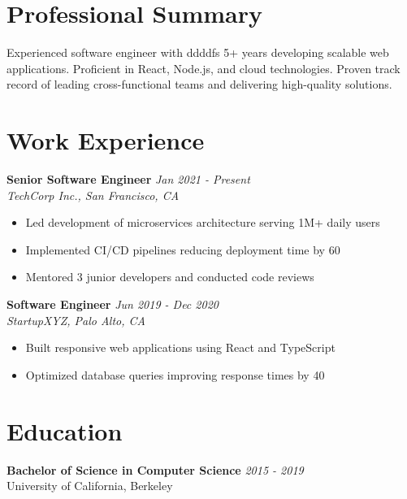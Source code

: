 \documentclass{article}
\begin{document}
\section*{Professional Summary}
Experienced software engineer with ddddfs 5+ years developing scalable web applications. Proficient in React, Node.js, and cloud technologies. Proven track record of leading cross-functional teams and delivering high-quality solutions.

\vspace{0.2cm}

\section*{Work Experience}

\textbf{Senior Software Engineer} \hfill \textit{Jan 2021 - Present} \\
\textit{TechCorp Inc., San Francisco, CA}
\begin{itemize}[leftmargin=*]
    \item Led development of microservices architecture serving 1M+ daily users
    \item Implemented CI/CD pipelines reducing deployment time by 60%
    \item Mentored 3 junior developers and conducted code reviews
\end{itemize}

\textbf{Software Engineer} \hfill \textit{Jun 2019 - Dec 2020} \\
\textit{StartupXYZ, Palo Alto, CA}
\begin{itemize}[leftmargin=*]
    \item Built responsive web applications using React and TypeScript
    \item Optimized database queries improving response times by 40%
\end{itemize}

\vspace{0.2cm}

\section*{Education}
\textbf{Bachelor of Science in Computer Science} \hfill \textit{2015 - 2019} \\
University of California, Berkeley

\vspace{0.2cm}
\end{document}
